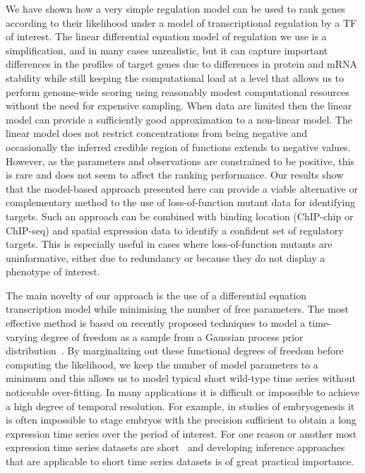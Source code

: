 \documentclass{pnastwo}
\begin{document}
\begin{article}
We have shown how a very simple regulation model can be used to rank
genes according to their likelihood under a model of transcriptional
regulation by a TF of interest. The linear differential equation model of regulation we use
is a simplification, and in many cases unrealistic, but it can capture important differences in
the profiles of target genes due to differences in protein and mRNA
stability while still keeping the computational load at a level
that allows us to perform genome-wide scoring using reasonably modest
computational resources without the need for expensive sampling.
When data are limited then the linear model can provide a sufficiently good
approximation to a non-linear model. 
The linear model does not restrict concentrations from being negative
and occasionally the inferred credible region of functions extends to negative
values. However, as the parameters and observations are constrained to be positive,
this is rare and does not seem to affect the ranking performance. Our
results show that the model-based approach presented here can provide
a viable alternative or complementary method to the use of
loss-of-function mutant data for identifying targets. Such an approach
can be combined with binding location (ChIP-chip or ChIP-seq)
and spatial expression data to identify a confident set of regulatory
targets. This is especially useful in cases where loss-of-function
mutants are uninformative, either due to redundancy or because they do
not display a phenotype of interest. 

The main novelty of our approach is the use of a differential equation
transcription model while minimising the number of free parameters.
The most effective method is based on recently proposed
techniques to model a time-varying degree of freedom as a sample from
a Gaussian process prior distribution~\cite{Gao2008}. By marginalizing
out these functional
degrees of freedom before computing the likelihood, we keep the
number of model parameters to a minimum and this allows us to model
typical short wild-type time series without noticeable over-fitting. In
many applications it is difficult or impossible to achieve a high
degree of temporal resolution. For example, in studies of
embryogenesis it is often impossible to stage embryos with the
precision sufficient to obtain a long expression time series over the
period of interest. For one reason or another most expression time
series datasets are short~\cite{Ernst2005} and developing inference approaches
that are applicable to short time series datasets is of great
practical importance.


\end{article}
\end{document}
